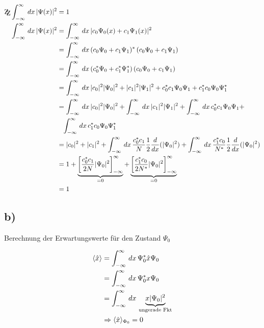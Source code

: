 \begin{align}
    \mathrm{Z\kern-.3em\raise-0.5ex\hbox{Z}} \int_{-\infty}^{\infty} \, dx \, \abs{\Psi (x)}^2&=1\\
    \int_{-\infty}^{\infty} \, dx\, \abs{\Psi (x)}^2 &= \int_{-\infty}^{\infty}\, dx\, \abs{c_0 \Psi _0 (x) + c_1 \Psi _1(x)}^2 \nonumber\\
    &=\int_{-\infty}^{\infty} \, dx\, (c_0 \Psi _0  + c_1 \Psi _1)^* \,(c_0 \Psi _0  + c_1 \Psi _1) \nonumber\\
    &=\int_{-\infty}^{\infty} \, dx\, (c_0^* \Psi _0  + c_1^* \Psi _1^*) \,(c_0 \Psi _0  + c_1 \Psi _1) \nonumber\\
    &=\int_{-\infty}^{\infty} \, dx\, \abs{c_0}^2 \abs{\Psi _0}^2+\abs{c_1}^2 \abs{\Psi _1}^2 + c_0^* c_1 \Psi _0 \Psi _1+c_1^* c_0 \Psi _0 \Psi_1^* \nonumber\\
    &=\int_{-\infty}^{\infty} \, dx\, \abs{c_0}^2 \abs{\Psi _0}^2 +\int_{-\infty}^{\infty} \, dx\,\abs{c_1}^2 \abs{\Psi _1}^2 +\int_{-\infty}^{\infty} \, dx\, c_0^* c_1 \Psi _0 \Psi _1+ \nonumber\\
    &\phantom{=} \int_{-\infty}^{\infty} \, dx\, c_1^* c_0 \Psi _0 \Psi_1^* \nonumber\\
    &= \abs{c_0}^2+\abs{c_1}^2+ \int_{-\infty}^ {\infty}\,dx\, \frac{c_0^*c_1}{N}\frac{1}{2} \frac{d}{d x}(\abs{\Psi _0}^2)+ \int_{-\infty}^{\infty} \,dx\, \frac{c_1^*c_0}{N^*}\frac{1}{2}\frac{d}{d x}(\abs{\Psi _0}^2) \nonumber\\
    &= 1+ \underbrace{\left[\frac{c_0^*c_1}{2N}\abs{\Psi _0}^2\right]_{-\infty}^{\infty}}_{=0} + \underbrace{\left[\frac{c_1^*c_0}{2N^*}\abs{\Psi _0}^2 \right]_{-\infty}^{\infty}}_{=0} \nonumber\\
    &=1 \nonumber
\end{align}

\subsection{b)}

Berechnung der Erwartungswerte für den Zustand $\Psi _0$

\begin{align}
    \langle\hat x \rangle &= \int_{-\infty}^{\infty}\,dx\, \Psi _0^* \hat x \Psi _0\\
    &= \int_{-\infty}^{\infty} \,dx\, \Psi _0^* x \Psi _0 \nonumber\\
    &= \int_{-\infty}^{\infty} \,dx\, \underbrace{x \lvert\Psi _0\rvert^2}_{\text{ungerade Fkt}} \nonumber\\
    &\Rightarrow \langle\hat x\rangle_{\Phi _0}=0
\end{align}


